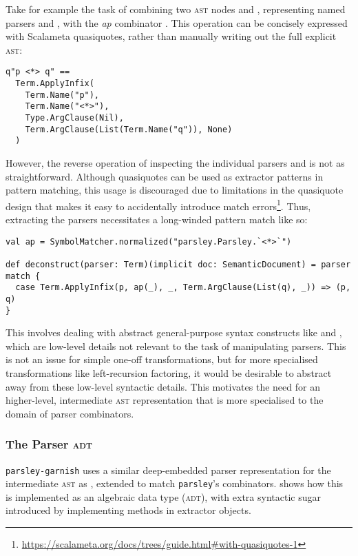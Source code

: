 \documentclass[../../main.tex]{subfiles}
\begin{document}
Take for example the task of combining two \textsc{ast} nodes  and , representing named parsers  and , with the \emph{ap} combinator \scala{<*>}.
This operation can be concisely expressed with Scalameta quasiquotes, rather than manually writing out the full explicit \textsc{ast}:
\begin{verbatim}
q"p <*> q" ==
  Term.ApplyInfix(
    Term.Name("p"),
    Term.Name("<*>"),
    Type.ArgClause(Nil),
    Term.ArgClause(List(Term.Name("q")), None)
  )
\end{verbatim}
However, the reverse operation of inspecting the individual parsers  and  is not as straightforward.
Although quasiquotes can be used as extractor patterns in pattern matching, this usage is discouraged due to limitations in the quasiquote design that makes it easy to accidentally introduce match errors\footnote{\url{https://scalameta.org/docs/trees/guide.html#with-quasiquotes-1}}.
Thus, extracting the parsers necessitates a long-winded pattern match like so:
\begin{verbatim}
val ap = SymbolMatcher.normalized("parsley.Parsley.`<*>`")

def deconstruct(parser: Term)(implicit doc: SemanticDocument) = parser match {
  case Term.ApplyInfix(p, ap(_), _, Term.ArgClause(List(q), _)) => (p, q)
}
\end{verbatim}
This involves dealing with abstract general-purpose syntax constructs like  and , which are low-level details not relevant to the task of manipulating parsers.
This is not an issue for simple one-off transformations, but for more specialised transformations like left-recursion factoring, it would be desirable to abstract away from these low-level syntactic details.
This motivates the need for an higher-level, intermediate \textsc{ast} representation that is more specialised to the domain of parser combinators.

\subsubsection{The Parser \textsc{adt}}
\texttt{parsley-garnish} uses a similar deep-embedded parser representation for the intermediate \textsc{ast} as \textcite{baars_leftrec_2004}, extended to match \texttt{parsley}'s combinators.
 shows how this is implemented as an algebraic data type (\textsc{adt}), with extra syntactic sugar introduced by implementing  methods in extractor objects.
\end{document}
